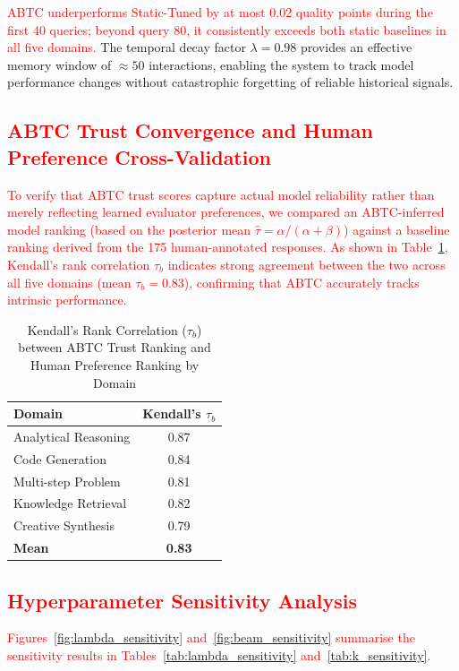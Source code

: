\documentclass{iopjournal}
\newcommand{\rev}[1]{\textcolor{red}{#1}}
\begin{document}
\rev{ABTC underperforms Static-Tuned by at most 0.02 quality points during the first 40 queries; beyond query 80, it consistently exceeds both static baselines in all five domains.} The temporal decay factor $\lambda = 0.98$ provides an effective memory window of $\approx 50$ interactions, enabling the system to track model performance changes without catastrophic forgetting of reliable historical signals.

\subsection{\rev{ABTC Trust Convergence and Human Preference Cross-Validation}}
\label{sec:learning_curves}

\rev{To verify that ABTC trust scores capture actual model reliability rather than merely reflecting learned evaluator preferences, we compared an ABTC-inferred model ranking (based on the posterior mean $\hat{\tau} = \alpha/(\alpha+\beta)$) against a baseline ranking derived from the 175 human-annotated responses. As shown in Table~\ref{tab:kendall}, Kendall's rank correlation $\tau_b$ indicates strong agreement between the two across all five domains (mean $\tau_b = 0.83$), confirming that ABTC accurately tracks intrinsic performance.}

\begin{table}[H]
\color{red}
\centering
\caption{Kendall's Rank Correlation ($\tau_b$) between ABTC Trust Ranking and Human Preference Ranking by Domain}
\label{tab:kendall}
\begin{tabular}{lc}
\toprule
\textbf{Domain} & \textbf{Kendall's $\tau_b$} \\
\midrule
Analytical Reasoning & 0.87 \\
Code Generation & 0.84 \\
Multi-step Problem & 0.81 \\
Knowledge Retrieval & 0.82 \\
Creative Synthesis & 0.79 \\
\midrule
\textbf{Mean} & \textbf{0.83} \\
\bottomrule
\end{tabular}
\end{table}

\subsection{\rev{Hyperparameter Sensitivity Analysis}}
\label{sec:sensitivity}
\rev{Figures~\ref{fig:lambda_sensitivity} and~\ref{fig:beam_sensitivity} summarise the sensitivity results in Tables~\ref{tab:lambda_sensitivity} and~\ref{tab:k_sensitivity}.}
\end{document}
